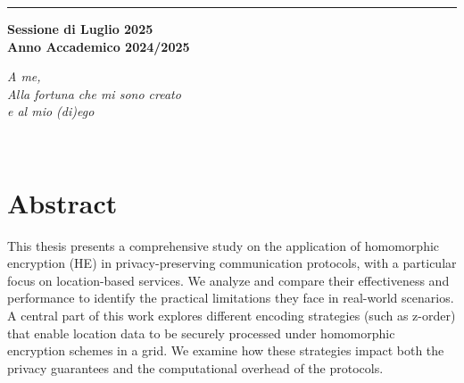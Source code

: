 \documentclass[12pt,a4paper,twoside]{book}
\begin{document}
\begin{titlepage}
\vspace{30mm}

\rule[0.5cm]{15.8cm}{0.6mm}

\begin{center}
{\large{\bf Sessione di Luglio 2025 \\}}
{\large{\bf Anno Accademico 2024/2025\\}}
\end{center}

\end{titlepage}

\restoregeometry
\newpage

\newpage

\topmargin=6.5cm
\begin{flushright}
\emph{
\LARGE{A me, }\\\vspace{2mm}
\LARGE{Alla fortuna che mi sono creato}\\\vspace{2mm}
\LARGE{e al mio (di)ego}\\\vspace{3mm} 
}
\end{flushright}
\newpage~\newpage
{}




\chapter*{Abstract}
This thesis presents a comprehensive study on the application of homomorphic encryption (HE) in privacy-preserving communication protocols, with a particular focus on location-based services. We analyze and compare their effectiveness and performance to identify the practical limitations they face in real-world scenarios. 
A central part of this work explores different encoding strategies (such as z-order) that enable location data to be securely processed under homomorphic encryption schemes in a grid. We examine how these strategies impact both the privacy guarantees and the computational overhead of the protocols.
\end{document}
